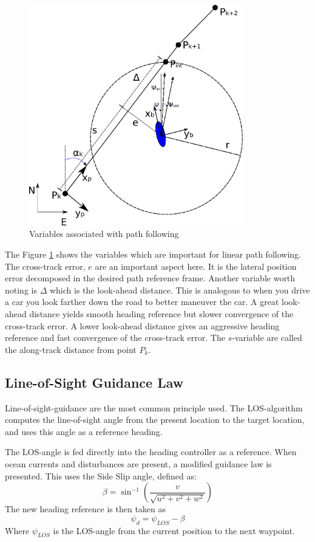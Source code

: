 		\begin{figure}[hbtp]
		\centering
		\includegraphics[width=0.83\textwidth]{pics/waypoint}
		\caption{Variables associated with path following}
		\label{fig:ch2-pathfollowing}
	\end{figure}
	The Figure \ref{fig:ch2-pathfollowing} shows the variables which are important for linear path following. The
	cross-track error, $e$ are an important aspect here. It is the lateral position error decomposed in
	the desired path reference frame. Another variable worth noting is $\Delta$ which is the look-ahead
	distance. This is analogous to when you drive a car you look farther down the road to better maneuver
	the car. A great look-ahead distance yields smooth heading reference but slower convergence of the
	cross-track error. A lower look-ahead distance gives an aggressive heading reference and fast
	convergence of the cross-track error. The $s$-variable are called the along-track distance from point
	$P_k$. 
	
	
	\subsection{Line-of-Sight Guidance Law}
	        Line-of-sight-guidance are the most common principle used. The LOS-algorithm computes
		the line-of-sight angle from the present location to the target location, and uses this
		angle as a reference heading.

		The LOS-angle is fed directly into the 
		heading controller as a reference. When ocean currents and disturbances are present, a
		modified guidance law is presented. This uses the Side Slip angle, defined as:
		\begin{equation}
			\label{eq:ch2-sideslip}
			\beta = \sin^{-1} ( \frac{v}{\sqrt{u^2 + v^2 + w^2}})
		\end{equation}
		The new heading reference is then taken as
		\begin{equation}
			\label{eq:ch2-los-law}
			\psi_d = \psi_{LOS} - \beta
		\end{equation}
		Where $\psi_{LOS}$ is the LOS-angle from the current position to the next waypoint. 

